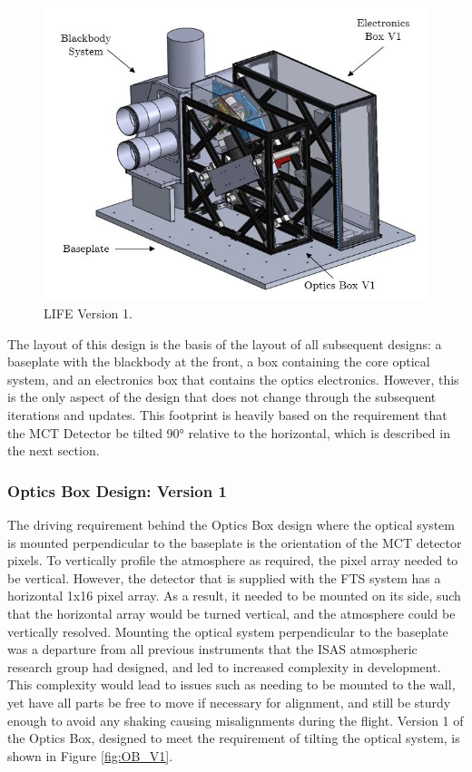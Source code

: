 \begin{figure}[h]
    \centering
    \includegraphics[width=0.8\linewidth]{chap3_images/LIFE_V1_images/LIFE_V1_labelled.JPG}
    \caption{LIFE Version 1.}
    \label{fig:LIFE_V1}
\end{figure}

The layout of this design is the basis of the layout of all subsequent designs: a baseplate with the blackbody at the front, a box containing the core optical system, and an electronics box that contains the optics electronics. However, this is the only aspect of the design that does not change through the subsequent iterations and updates. This footprint is heavily based on the requirement that the MCT Detector be tilted 90° relative to the horizontal, which is described in the next section.

\subsubsection{Optics Box Design: Version 1}
The driving requirement behind the Optics Box design where the optical system is mounted perpendicular to the baseplate is the orientation of the MCT detector pixels. To vertically profile the atmosphere as required, the pixel array needed to be vertical. However, the detector that is supplied with the FTS system has a horizontal 1x16 pixel array. As a result, it needed to be mounted on its side, such that the horizontal array would be turned vertical, and the atmosphere could be vertically resolved. Mounting the optical system perpendicular to the baseplate was a departure from all previous instruments that the ISAS atmospheric research group had designed, and led to increased complexity in development. This complexity would lead to issues such as needing to be mounted to the wall, yet have all parts be free to move if necessary for alignment, and still be sturdy enough to avoid any shaking causing misalignments during the flight. Version 1 of the Optics Box, designed to meet the requirement of tilting the optical system, is shown in Figure \ref{fig:OB_V1}.

